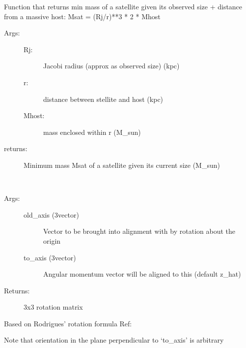 \documentclass[letterpaper,10pt,english]{sphinxmanual}
\begin{document}
\begin{fulllineitems}
\label{\detokenize{utilities:galaxy.utilities.jacobi_mass}}
Function that returns min mass of a satellite given its observed size + distance 
from a massive host: Msat = (Rj/r)**3 * 2 * Mhost
\begin{description}
\item[{Args:}] \leavevmode\begin{description}
\item[{Rj: }] \leavevmode
Jacobi radius (approx as observed size) (kpc)

\item[{r: }] \leavevmode
distance between stellite and host (kpc)

\item[{Mhost: }] \leavevmode
mass enclosed within r (M\_sun)

\end{description}

\item[{returns: }] \leavevmode
Minimum mass Msat of a satellite given its current size (M\_sun)

\end{description}

\end{fulllineitems}


\begin{fulllineitems}
\label{\detokenize{utilities:galaxy.utilities.rotation_matrix_to_vector}}~\begin{description}
\item[{Args: }] \leavevmode\begin{description}
\item[{old\_axis (3\sphinxhyphen{}vector)}] \leavevmode
Vector to be brought into alignment with  by rotation about the origin

\item[{to\_axis (3\sphinxhyphen{}vector)}] \leavevmode
Angular momentum vector will be aligned to this (default z\_hat)

\end{description}

\item[{Returns: }] \leavevmode
3x3 rotation matrix

\end{description}

Based on Rodrigues’ rotation formula
Ref: 

Note that orientation in the plane perpendicular to ‘to\_axis’ is arbitrary

\end{fulllineitems}
\end{document}
